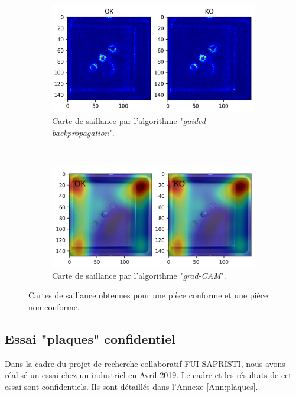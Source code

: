 \begin{figure}[hb!]
	\centering
	\begin{subfigure}[c]{0.63\textwidth}
		\includegraphics[width=\textwidth]{../Chap5/Figures/visualize_saliency_more_guided.png}
		\caption{Carte de saillance par l'algorithme "\textit{guided backpropagation}".}
	\end{subfigure}
	\\
	\bigskip
	\begin{subfigure}[c]{0.63\textwidth}
		\includegraphics[width=\textwidth]{../Chap5/Figures/visualize_saliency_grad-CAM_relu.png}
		\caption{Carte de saillance par l'algorithme "\textit{grad-CAM}".}
	\end{subfigure}
	\caption{Cartes de saillance obtenues pour une pièce conforme et une pièce non-conforme.}
	\label{fig:saliency}
\end{figure}

\subsection{Essai "plaques" confidentiel}
Dans la cadre du projet de recherche collaboratif FUI SAPRISTI, nous avons réalisé un essai chez un industriel en Avril 2019.
Le cadre et les résultats de cet essai sont confidentiels.
Ils sont détaillés dans l'Annexe \ref{Ann:plaques}.

